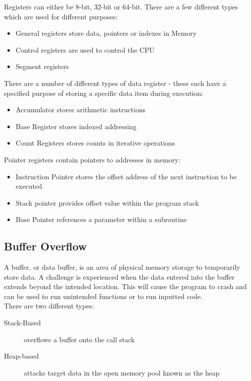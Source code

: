 Registers can either be 8-bit, 32-bit or 64-bit. There are a few different types which are used for different purposes:
\begin{itemize}
    \item General registers store data, pointers or indexes in Memory
    \item Control registers are used to control the CPU
    \item Segment registers
\end{itemize}

There are a number of different types of data register - these each have a specified purpose of storing a specific data item during execution:
\begin{itemize}
    \item Accumulator stores arithmetic instructions
    \item Base Register stores indexed addressing
    \item Count Registers stores counts in iterative operations
\end{itemize}

Pointer registers contain pointers to addresses in memory:
\begin{itemize}
    \item Instruction Pointer stores the offset address of the next instruction to be executed
    \item Stack pointer provides offset value within the program stack
    \item Base Pointer references a parameter within a subroutine
\end{itemize}

\subsection{Buffer Overflow}
A buffer, or data buffer, is an area of physical memory storage to temporarily store data. A challenge is experienced when the data entered into the buffer extends beyond the intended location. This will cause the program to crash and can be used to run unintended functions or to run inputted code. \\

There are two different types:
\begin{description}
    \item[Stack-Based] overflows a buffer onto the call stack
    \item[Heap-based] attacks target data in the open memory pool known as the heap
\end{description}

